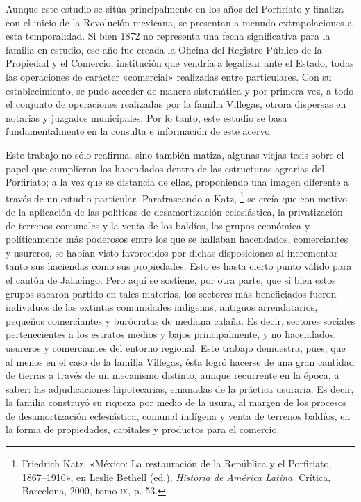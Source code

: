 \documentclass[14pt,twoside,final]{extbook} %
\let\oldfootnote\footnote
\renewcommand\footnote[1]{%
\oldfootnote{\hspace{1mm}#1}}
\begin{document}
Aunque este estudio se sitúa principalmente en los años del Porfiriato y finaliza con el inicio de la Revolución mexicana, se presentan a menudo extrapolaciones a esta temporalidad. Si bien 1872 no representa una fecha significativa para la familia en estudio, ese año fue creada la Oficina del Registro Público de la Propiedad y el Comercio, institución que vendría a legalizar ante el Estado, todas las operaciones de carácter «comercial» realizadas entre particulares. Con su establecimiento, se pudo acceder de manera sistemática y por primera vez, a todo el conjunto de operaciones realizadas por la familia Villegas, otrora dispersas en notarías y juzgados municipales. Por lo tanto, este estudio se basa fundamentalmente en la consulta e información de este acervo.

Este trabajo no sólo reafirma, sino también matiza, algunas viejas tesis sobre el papel que cumplieron los hacendados dentro de las estructuras agrarias del Porfiriato; a la vez que se distancia de ellas, proponiendo una imagen diferente a través de un estudio particular. Parafraseando a Katz,\footnote{Friedrich Katz, «México: La restauración de la República y el Porfiriato, 1867--1910», en Leslie Bethell (ed.), \emph{Historia de América Latina.} Crítica, Barcelona, 2000, tomo \textsc{ix}, p. 53.} se creía que con motivo de la aplicación de las políticas de desamortización eclesiástica, la privatización de terrenos comunales y la venta de los baldíos, los grupos económica y políticamente más poderosos entre los que se hallaban hacendados, comerciantes y usureros, se habían visto favorecidos por dichas disposiciones al incrementar tanto sus haciendas como sus propiedades. Esto es hasta cierto punto válido para el cantón de Jalacingo. Pero aquí se sostiene, por otra parte, que si bien estos grupos sacaron partido en tales materias, los sectores más beneficiados fueron individuos de las extintas comunidades indígenas, antiguos arrendatarios, pequeños comerciantes y burócratas de mediana calaña. Es decir, sectores sociales pertenecientes a los estratos medios y bajos principalmente, y no hacendados, usureros y comerciantes del entorno regional. Este trabajo demuestra, pues, que al menos en el caso de la familia Villegas, ésta logró hacerse de una gran cantidad de tierras a través de un mecanismo distinto, aunque recurrente en la época, a saber: las adjudicaciones hipotecarias, emanadas de la práctica usuraria. Es decir, la familia construyó su riqueza por medio de la usura, al margen de los procesos de desamortización eclesiástica, comunal indígena y venta de terrenos baldíos, en la forma de propiedades, capitales y productos para el comercio.
\end{document}
